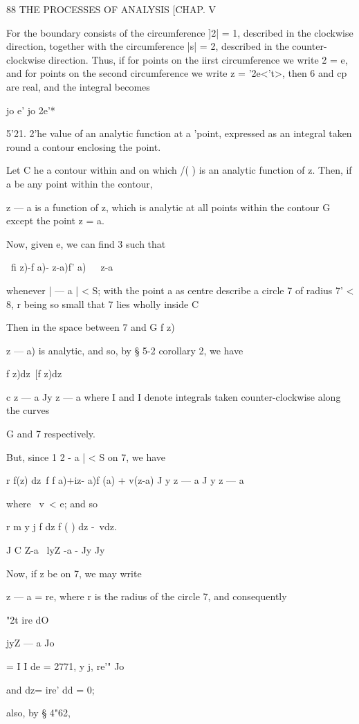{  

88 THE PROCESSES OF ANALYSIS [CHAP. V

For the boundary consists of the circumference ]2| = 1, described in
the clockwise direction, together with the circumference |s| = 2,
described in the counter-clockwise direction. Thus, if for points on
the iirst circumference we write 2 = e, and for points on the second
circumference we write z = '2e<'t>, then 6 and cp are real, and the
integral becomes

jo e' jo 2e'*

5'21. 2'he value of an analytic function at a 'point, expressed as an
integral taken round a contour enclosing the point.

Let C he a contour within and on which /( ) is an analytic function of
z. Then, if a be any point within the contour,

z — a is a function of z, which is analytic at all points within the
contour G except the point z = a.

Now, given e, we can find 3 such that

\ fi z)-f a)- z-a)f' a)\ \ \ z-a\

whenever | — a | < S; with the point a as centre describe a circle 7
of radius 7' < 8, r being so small that 7 lies wholly inside C

Then in the space between 7 and G f z)\ \ {z — a) is analytic, and so,
by § 5-2 corollary 2, we have

f z)dz\ [f z)dz

c z — a Jy z — a where I and I denote integrals taken
counter-clockwise along the curves

G and 7 respectively.

But, since 1 2 - a | < S on 7, we have

r f(z) dz\ f f a)+iz- a)f (a) + v(z-a) J y z — a J y z — a

where \ v\ < e; and so

r m y j f dz f ( ) dz -\ vdz.

J C Z-a \ lyZ -a - Jy Jy

Now, if z be on 7, we may write

z — a = re, where r is the radius of the circle 7, and consequently

"2t ire dO

jyZ — a Jo

= I I de = 2771, y j, re'" Jo

and dz= ire' dd = 0;

also, by § 4"62,

}}

